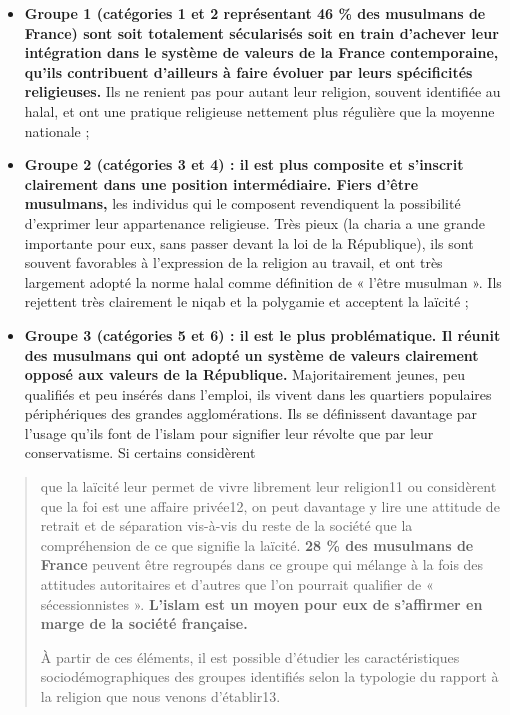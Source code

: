\begin{itemize}
\item
  \textbf{Groupe 1 (catégories 1 et 2 représentant 46 \% des musulmans
  de France) sont soit totalement sécularisés soit en train d'achever
  leur intégration dans le système de valeurs de la France
  contemporaine, qu'ils contribuent d'ailleurs à faire évoluer par leurs
  spécificités religieuses.} Ils ne renient pas pour autant leur
  religion, souvent identifiée au halal, et ont une pratique religieuse
  nettement plus régulière que la moyenne nationale ;
\item
  \textbf{Groupe 2 (catégories 3 et 4) : il est plus composite et
  s'inscrit clairement dans une position intermédiaire. Fiers d'être
  musulmans,} les individus qui le composent revendiquent la possibilité
  d'exprimer leur appartenance religieuse. Très pieux (la charia a une
  grande importante pour eux, sans passer devant la loi de la
  République), ils sont souvent favorables à l'expression de la religion
  au travail, et ont très largement adopté la norme halal comme
  définition de « l'être musulman ». Ils rejettent très clairement le
  niqab et la polygamie et acceptent la laïcité ;
\item
  \textbf{Groupe 3 (catégories 5 et 6) : il est le plus problématique.
  Il réunit des musulmans qui ont adopté un système de valeurs
  clairement opposé aux valeurs de la République.} Majoritairement
  jeunes, peu qualifiés et peu insérés dans l'emploi, ils vivent dans
  les quartiers populaires périphériques des grandes agglomérations. Ils
  se définissent davantage par l'usage qu'ils font de l'islam pour
  signifier leur révolte que par leur conservatisme. Si certains
  considèrent
\end{itemize}

\begin{quote}


que la laïcité leur permet de vivre librement leur religion11 ou
considèrent que la foi est une affaire privée12, on peut davantage y
lire une attitude de retrait et de séparation vis-à-vis du reste de la
société que la compréhension de ce que signifie la laïcité. \textbf{28
\% des musulmans de France} peuvent être regroupés dans ce groupe qui
mélange à la fois des attitudes autoritaires et d'autres que l'on
pourrait qualifier de « sécessionnistes ». \textbf{L'islam est un moyen
pour eux de s'affirmer en marge de la société française.}

À partir de ces éléments, il est possible d'étudier les caractéristiques
sociodémographiques des groupes identifiés selon la typologie du rapport
à la religion que nous venons d'établir13.
\end{quote}

